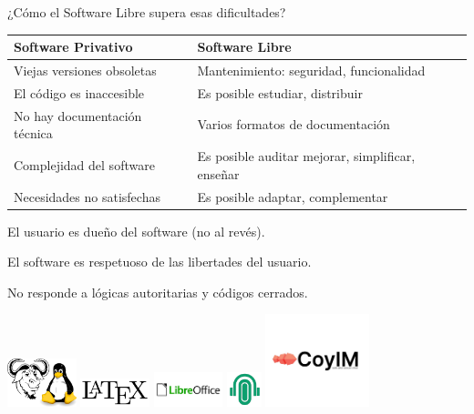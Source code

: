 \documentclass[spanish]{beamer}
\begin{document}
\begin{frame}{¿Cómo el Software Libre supera esas dificultades?}
    \centering
    \resizebox{12cm}{!}
    {
    \begin{tabular}{|l|l|}
        \hline        
        \rowcolor{lightgray}\textbf{Software Privativo} & \textbf{Software Libre}\\ 
        \hline
        \hline
        Viejas versiones obsoletas & Mantenimiento: seguridad, funcionalidad \\ 
        \hline
        El código es inaccesible & Es posible estudiar, distribuir \\
        \hline
        No hay documentación técnica & Varios formatos de documentación \\
        \hline
        Complejidad del software & Es posible auditar \MVRightArrow{} mejorar, simplificar, enseñar \\
        \hline
        Necesidades no satisfechas & Es posible adaptar, complementar \\
        \hline
    \end{tabular}
    }
    
    \vspace{0.3cm}
    El usuario es dueño del software (no al revés). 
    
    El software es respetuoso de las libertades del usuario.

    No responde a lógicas autoritarias y códigos cerrados.

    \includegraphics[width=2cm]{img/GNU_and_Tux.jpg}
    \includegraphics[width=2cm]{img/latex.jpg}
    \includegraphics[width=2cm]{img/libreoffice.png}
    \includegraphics[width=1cm]{img/wahay.jpg}
    \includegraphics[width=3cm]{img/coyim.jpeg}
    
    
\end{frame}
\end{document}
